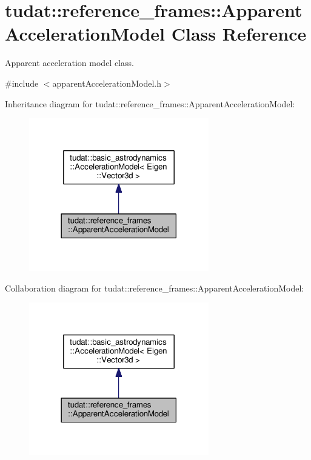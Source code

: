 \hypertarget{classtudat_1_1reference__frames_1_1ApparentAccelerationModel}{}\section{tudat\+:\+:reference\+\_\+frames\+:\+:Apparent\+Acceleration\+Model Class Reference}
\label{classtudat_1_1reference__frames_1_1ApparentAccelerationModel}


Apparent acceleration model class.  




{\ttfamily \#include $<$apparent\+Acceleration\+Model.\+h$>$}



Inheritance diagram for tudat\+:\+:reference\+\_\+frames\+:\+:Apparent\+Acceleration\+Model\+:
\nopagebreak
\begin{figure}[H]
\begin{center}
\leavevmode
\includegraphics[width=222pt]{classtudat_1_1reference__frames_1_1ApparentAccelerationModel__inherit__graph}
\end{center}
\end{figure}


Collaboration diagram for tudat\+:\+:reference\+\_\+frames\+:\+:Apparent\+Acceleration\+Model\+:
\nopagebreak
\begin{figure}[H]
\begin{center}
\leavevmode
\includegraphics[width=222pt]{classtudat_1_1reference__frames_1_1ApparentAccelerationModel__coll__graph}
\end{center}
\end{figure}
